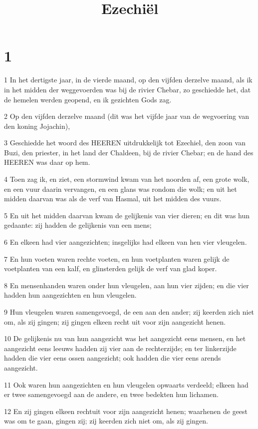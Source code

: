 

\title{Ezechiël}



\chapter{1}

\par 1 In het dertigste jaar, in de vierde maand, op den vijfden derzelve maand, als ik in het midden der weggevoerden was bij de rivier Chebar, zo geschiedde het, dat de hemelen werden geopend, en ik gezichten Gods zag.
\par 2 Op den vijfden derzelve maand (dit was het vijfde jaar van de wegvoering van den koning Jojachin),
\par 3 Geschiedde het woord des HEEREN uitdrukkelijk tot Ezechiel, den zoon van Buzi, den priester, in het land der Chaldeen, bij de rivier Chebar; en de hand des HEEREN was daar op hem.
\par 4 Toen zag ik, en ziet, een stormwind kwam van het noorden af, een grote wolk, en een vuur daarin vervangen, en een glans was rondom die wolk; en uit het midden daarvan was als de verf van Hasmal, uit het midden des vuurs.
\par 5 En uit het midden daarvan kwam de gelijkenis van vier dieren; en dit was hun gedaante: zij hadden de gelijkenis van een mens;
\par 6 En elkeen had vier aangezichten; insgelijks had elkeen van hen vier vleugelen.
\par 7 En hun voeten waren rechte voeten, en hun voetplanten waren gelijk de voetplanten van een kalf, en glinsterden gelijk de verf van glad koper.
\par 8 En mensenhanden waren onder hun vleugelen, aan hun vier zijden; en die vier hadden hun aangezichten en hun vleugelen.
\par 9 Hun vleugelen waren samengevoegd, de een aan den ander; zij keerden zich niet om, als zij gingen; zij gingen elkeen recht uit voor zijn aangezicht henen.
\par 10 De gelijkenis nu van hun aangezicht was het aangezicht eens mensen, en het aangezicht eens leeuws hadden zij vier aan de rechterzijde; en ter linkerzijde hadden die vier eens ossen aangezicht; ook hadden die vier eens arends aangezicht.
\par 11 Ook waren hun aangezichten en hun vleugelen opwaarts verdeeld; elkeen had er twee samengevoegd aan de andere, en twee bedekten hun lichamen.
\par 12 En zij gingen elkeen rechtuit voor zijn aangezicht henen; waarhenen de geest was om te gaan, gingen zij; zij keerden zich niet om, als zij gingen.
